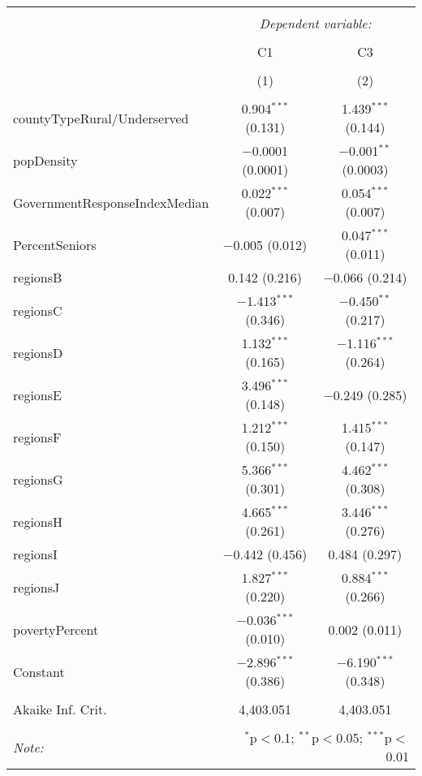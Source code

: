 
\begin{table}[!htbp] \centering 
  \caption{} 
  \label{} 
\begin{tabular}{@{\extracolsep{5pt}}lcc} 
\\[-1.8ex]\hline 
\hline \\[-1.8ex] 
 & \multicolumn{2}{c}{\textit{Dependent variable:}} \\ 
\cline{2-3} 
\\[-1.8ex] & C1 & C3 \\ 
\\[-1.8ex] & (1) & (2)\\ 
\hline \\[-1.8ex] 
 countyTypeRural/Underserved & 0.904$^{***}$ (0.131) & 1.439$^{***}$ (0.144) \\ 
  popDensity & $-$0.0001 (0.0001) & $-$0.001$^{**}$ (0.0003) \\ 
  GovernmentResponseIndexMedian & 0.022$^{***}$ (0.007) & 0.054$^{***}$ (0.007) \\ 
  PercentSeniors & $-$0.005 (0.012) & 0.047$^{***}$ (0.011) \\ 
  regionsB & 0.142 (0.216) & $-$0.066 (0.214) \\ 
  regionsC & $-$1.413$^{***}$ (0.346) & $-$0.450$^{**}$ (0.217) \\ 
  regionsD & 1.132$^{***}$ (0.165) & $-$1.116$^{***}$ (0.264) \\ 
  regionsE & 3.496$^{***}$ (0.148) & $-$0.249 (0.285) \\ 
  regionsF & 1.212$^{***}$ (0.150) & 1.415$^{***}$ (0.147) \\ 
  regionsG & 5.366$^{***}$ (0.301) & 4.462$^{***}$ (0.308) \\ 
  regionsH & 4.665$^{***}$ (0.261) & 3.446$^{***}$ (0.276) \\ 
  regionsI & $-$0.442 (0.456) & 0.484 (0.297) \\ 
  regionsJ & 1.827$^{***}$ (0.220) & 0.884$^{***}$ (0.266) \\ 
  povertyPercent & $-$0.036$^{***}$ (0.010) & 0.002 (0.011) \\ 
  Constant & $-$2.896$^{***}$ (0.386) & $-$6.190$^{***}$ (0.348) \\ 
 \hline \\[-1.8ex] 
Akaike Inf. Crit. & 4,403.051 & 4,403.051 \\ 
\hline 
\hline \\[-1.8ex] 
\textit{Note:}  & \multicolumn{2}{r}{$^{*}$p$<$0.1; $^{**}$p$<$0.05; $^{***}$p$<$0.01} \\ 
\end{tabular} 
\end{table} 
